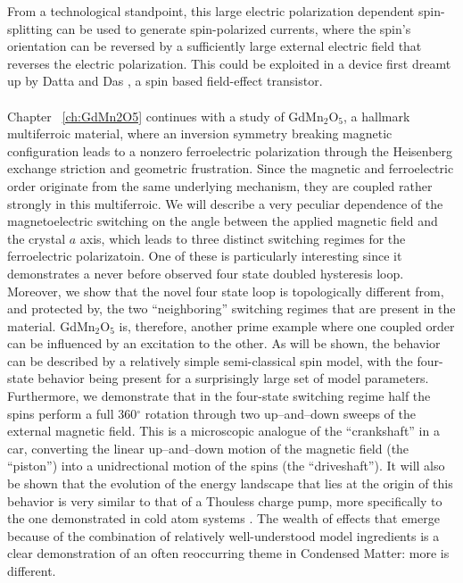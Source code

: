 From a technological standpoint, this large electric polarization dependent spin-splitting can be used to generate spin-polarized currents, where the spin's orientation can be reversed by a sufficiently large external electric field that reverses the electric polarization.
This could be exploited in a device first dreamt up by Datta and Das \cite{Datta1990}, a spin based field-effect transistor.
\\\\
Chapter ~\ref{ch:GdMn2O5} continues with a study of GdMn$_2$O$_5$, a hallmark multiferroic material, where an inversion symmetry breaking magnetic configuration leads to a nonzero ferroelectric polarization through the Heisenberg exchange striction and geometric frustration.
Since the magnetic and ferroelectric order originate from the same underlying mechanism, they are coupled rather strongly in this multiferroic.
We will describe a very peculiar dependence of the magnetoelectric switching on the angle between the applied magnetic field and the crystal $a$ axis, which leads to three distinct switching regimes for the ferroelectric polarizatoin.
One of these is particularly interesting since it demonstrates a never before observed four state doubled hysteresis loop.
Moreover, we show that the novel four state loop is topologically different from, and protected by, the two ``neighboring'' switching regimes that are present in the material.
GdMn$_2$O$_5$ is, therefore, another prime example where one coupled order can be influenced by an excitation to the other.
As will be shown, the behavior can be described by a relatively simple semi-classical spin model, with the four-state behavior being present for a surprisingly large set of model parameters.
Furthermore, we demonstrate that in the four-state switching regime half the spins perform a full 360$^\circ$ rotation through two up--and--down sweeps of the external magnetic field.
This is a microscopic analogue of the ``crankshaft'' in a car, converting the linear up--and--down motion of the magnetic field (the ``piston'') into a unidrectional motion of the spins (the ``driveshaft'').
It will also be shown that the evolution of the energy landscape that lies at the origin of this behavior is very similar to that of a Thouless charge pump, more specifically to the one demonstrated in cold atom systems \cite{Lohse16}.
The wealth of effects that emerge because of the combination of relatively well-understood model ingredients is a clear demonstration of an often reoccurring theme in Condensed Matter: more is different.  
\\\\

